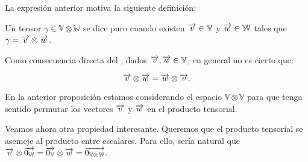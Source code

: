 La expresión anterior motiva la siguiente definición:

\begin{definicion} \label{def:tensor_puro}
	Un tensor $\gamma \in \mathbb{V} \otimes \mathbb{W}$ se dice puro cuando existen $\overrightarrow{v} \in \mathbb{V}$ y $\overrightarrow{w} \in \mathbb{W}$ tales que $\gamma = \overrightarrow{v} \otimes \overrightarrow{w}$.
\end{definicion}

\begin{proposicion}
	Como consecuencia directa del , dados $\overrightarrow{v}, \overrightarrow{w} \in \mathbb{V}$, en general no es cierto que:

	\begin{equation}
		\overrightarrow{v} \otimes \overrightarrow{w} = \overrightarrow{w} \otimes \overrightarrow{v}.
	\end{equation}

	\begin{observacion}
		En la anterior proposición estamos considerando el espacio $\mathbb{V} \otimes \mathbb{V}$ para que tenga sentido permutar los vectores $\overrightarrow{v}$ y $\overrightarrow{w}$ en el producto tensorial.
	\end{observacion}
\end{proposicion}

Veamos ahora otra propiedad interesante. Queremos que el producto tensorial se asemeje al producto entre escalares. Para ello, sería natural que $\overrightarrow{v} \otimes \overrightarrow{0_\mathbb{W}} = \overrightarrow{0_{\mathbb{V}}} \otimes \overrightarrow{w} = \overrightarrow{0_{\mathbb{V} \otimes \mathbb{W}}}$.

